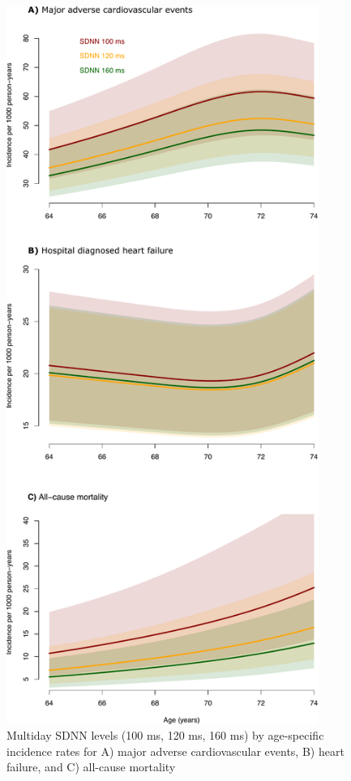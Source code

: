 \documentclass[
  a4paper,
  headsepline=true,
  open=any]{scrbook}
\begin{document}
\begin{figure}

{\centering \includegraphics[width=4in,height=\textheight]{images/addition_pro_hrv_ir_mace.pdf}

}

\caption{Multiday SDNN levels (100 ms, 120 ms, 160 ms) by age-specific
incidence rates for A) major adverse cardiovascular events, B) heart
failure, and C) all-cause mortality}

\end{figure}
\end{document}
